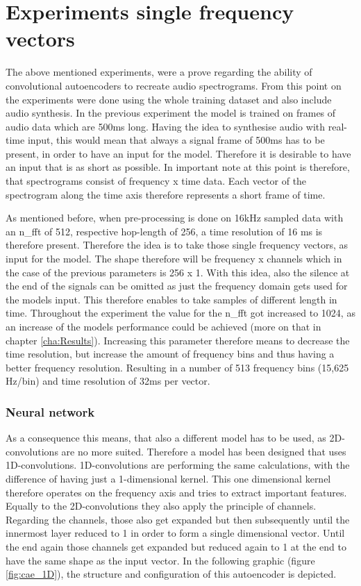 \section{Experiments single frequency vectors}
The above mentioned experiments, were a prove regarding the ability of convolutional autoencoders to recreate audio spectrograms. From this point on the experiments were done using the whole training dataset and also include audio synthesis. In the previous experiment the model is trained on frames of audio data which are 500ms long. Having the idea to synthesise audio with real-time input, this would mean that always a signal frame of 500ms has to be present, in order to have an input for the model. Therefore it is desirable to have an input that is as short as possible. In important note at this point is therefore, that spectrograms consist of frequency x time data. Each vector of the spectrogram along the time axis therefore represents a short frame of time. 

As mentioned before, when pre-processing is done on 16kHz sampled data with an n\_fft of 512, respective hop-length of 256, a time resolution of 16 ms is therefore present. Therefore the idea is to take those single frequency vectors, as input for the model. The shape therefore will be frequency x channels which in the case of the previous parameters is 256 x 1. With this idea, also the silence at the end of the signals can be omitted as just the frequency domain gets used for the models input. This therefore enables to take samples of different length in time. Throughout the experiment the value for the n\_fft got increased to 1024, as an increase of the models performance could be achieved (more on that in chapter \ref{cha:Results}). Increasing this parameter therefore means to decrease the time resolution, but increase the amount of frequency bins and thus having a better frequency resolution. Resulting in a number of 513 frequency bins (15,625 Hz/bin) and time resolution of 32ms per vector.


\subsubsection{Neural network}
As a consequence this means, that also a different model has to be used, as 2D-convolutions are no more suited. Therefore a model has been designed that uses 1D-convolutions. 1D-convolutions are performing the same calculations, with the difference of having just a 1-dimensional kernel. This one dimensional kernel therefore operates on the frequency axis and tries to extract important features. Equally to the 2D-convolutions they also apply the principle of channels. Regarding the channels, those also get expanded but then subsequently until the innermost layer reduced to 1 in order to form a single dimensional vector. Until the end again those channels get expanded but reduced again to 1 at the end to have the same shape as the input vector. In the following graphic (figure \ref{fig:cae_1D}), the structure and configuration of this autoencoder is depicted. 


